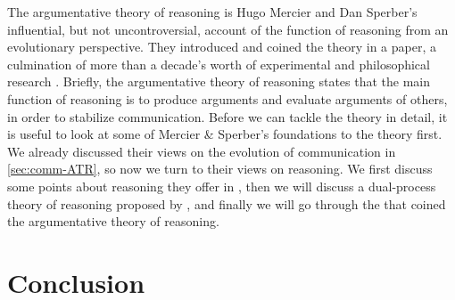 The argumentative theory of reasoning is Hugo Mercier and Dan Sperber's influential, but not uncontroversial, account of the function of reasoning from an evolutionary perspective. They introduced and coined the theory in a \citeyear{MS11} paper, a culmination of more than a decade's worth of experimental and philosophical research \citep{Sperber01, Sperber10, MS09, Sperber00}.
Briefly, the argumentative theory of reasoning states that the main function of reasoning is to produce arguments and evaluate arguments of others, in order to stabilize communication.
Before we can tackle the theory in detail, it is useful to look at some of Mercier \& Sperber's foundations to the theory first. We already discussed their views on the evolution of communication in \cref{sec:comm-ATR}, so now we turn to their views on reasoning. We first discuss some points about reasoning they offer in \citet{Sperber01,Sperber10}, then we will discuss a dual-process theory of reasoning proposed by \citet{MS09}, and finally we will go through the \citeyear{MS11} that coined the argumentative theory of reasoning.

\section{Conclusion}
